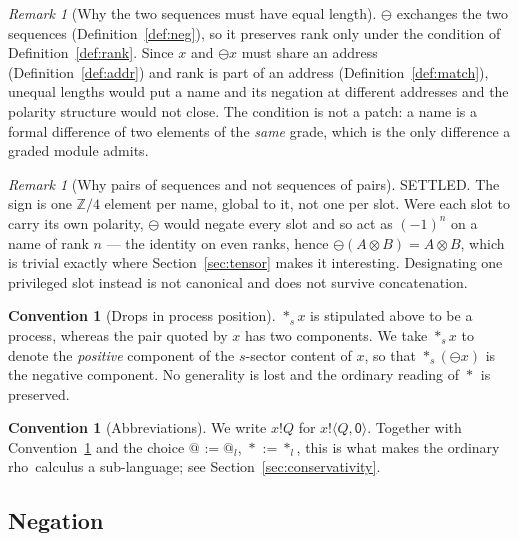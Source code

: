 \documentclass[11pt]{article}
\makeatletter
\theoremstyle{definition}
\newtheorem{convention}[theorem]{Convention}
\theoremstyle{remark}
\newtheorem{remark}[theorem]{Remark}
\newcommand{\rhoc}{\textsf{rho}}
\newcommand{\pzero}{\mathsf{0}}
\newcommand{\quo}[1]{\ensuremath{@_{#1}}}
\newcommand{\drp}[1]{\ensuremath{*_{#1}}}
\newcommand{\dip}[2]{\ensuremath{\langle #1 , #2 \rangle}}
\newcommand{\negop}{\ensuremath{\ominus}}
\makeatother
\begin{document}
\begin{remark}[Why the two sequences must have equal length]
\label{rem:equallength}
$\negop$ exchanges the two sequences (Definition~\ref{def:neg}), so it preserves
rank only under the condition of Definition~\ref{def:rank}. Since $x$ and
$\negop x$ must share an address (Definition~\ref{def:addr}) and rank is part of
an address (Definition~\ref{def:match}), unequal lengths would put a name and
its negation at different addresses and the polarity structure would not close.
The condition is not a patch: a name is a formal difference of two elements of
the \emph{same} grade, which is the only difference a graded module admits.
\end{remark}

\begin{remark}[Why pairs of sequences and not sequences of pairs]
\label{rem:pairsofseqs}
SETTLED. The sign is one $\mathbb{Z}/4$ element per name, global to it, not one
per slot. Were each slot to carry its own polarity, $\negop$ would negate every
slot and so act as $(-1)^{n}$ on a name of rank $n$ --- the identity on even
ranks, hence $\negop(A \otimes B) = A \otimes B$, which is trivial exactly where
Section~\ref{sec:tensor} makes it interesting. Designating one privileged slot
instead is not canonical and does not survive concatenation.
\end{remark}

\begin{convention}[Drops in process position]
\label{con:drop}
$\drp{s}x$ is stipulated above to be a process, whereas the pair quoted by $x$
has two components. We take $\drp{s}x$ to denote the \emph{positive} component
of the $s$-sector content of $x$, so that $\drp{s}(\negop x)$ is the negative
component. No generality is lost and the ordinary reading of $\drp{}$ is
preserved.
\end{convention}

\begin{convention}[Abbreviations]
We write $x!Q$ for $x!\dip{Q}{\pzero}$. Together with
Convention~\ref{con:drop} and the choice $\quo{} := \quo{l}$, $\drp{} :=
\drp{l}$, this is what makes the ordinary \rhoc\ calculus a sub-language; see
Section~\ref{sec:conservativity}.
\end{convention}

\subsection{Negation}
\end{document}
